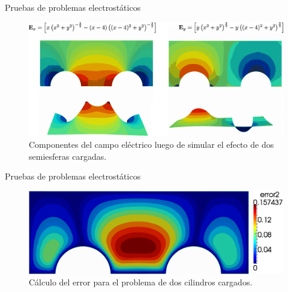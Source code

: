 \documentclass[xcolor=table,serif]{beamer}
\begin{document}
	\begin{frame}{Pruebas de problemas electrostáticos}
		\begin{figure}
		\centering
		\includegraphics[scale=0.18]{two_cylinders.eps}
		\caption{Componentes del campo eléctrico luego de simular el efecto de dos semiesferas cargadas.}
		\end{figure}
	\end{frame}
	\begin{frame}{Pruebas de problemas electrostáticos}
		\begin{figure}
		\centering
		\includegraphics[scale=0.4]{two_cylinders_error.eps}
		\caption{Cálculo del error para el problema de dos cilindros cargados.}
		\end{figure}
	\end{frame}
\end{document}
